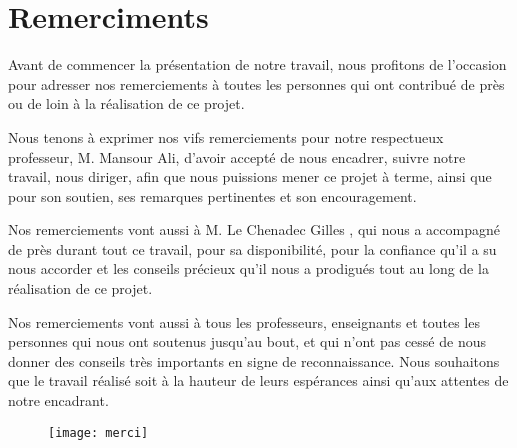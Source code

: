 
\chapter*{Remerciments}

Avant de commencer la présentation de notre travail, nous profitons de l’occasion pour adresser nos remerciements à toutes les personnes qui ont contribué de près ou de loin à la réalisation de ce projet.

Nous tenons à exprimer nos vifs remerciements pour notre respectueux professeur, M. Mansour Ali, d’avoir accepté de nous encadrer, suivre notre travail, nous diriger, afin que nous puissions mener ce projet à terme, ainsi que pour son soutien, ses remarques pertinentes et son encouragement.

Nos remerciements vont aussi à M. Le Chenadec Gilles , qui nous a accompagné de près durant tout ce travail, pour sa disponibilité, pour la confiance qu’il a su nous accorder et les conseils précieux qu’il nous a prodigués tout au long de la réalisation de ce projet.

Nos remerciements vont aussi à tous les professeurs, enseignants et toutes les personnes qui nous ont soutenus jusqu’au bout, et qui n’ont pas cessé de nous donner des conseils très importants en signe de reconnaissance. Nous souhaitons que le travail réalisé soit à la hauteur de leurs espérances ainsi qu’aux attentes de notre encadrant.


\begin{figure}[!h]
  \centering
  \texttt{[image: merci]}
\end{figure}

